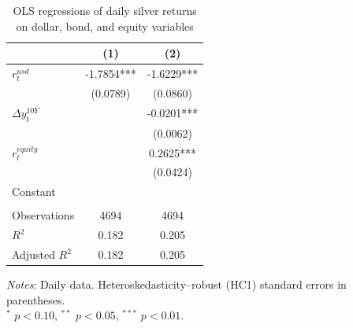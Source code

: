 \begin{table}[H]
\centering
\caption{OLS regressions of daily silver returns on dollar, bond, and equity variables}
\label{tab:ols_silver_dollar}
\begin{tabular}{lcc}
\toprule
 & (1) & (2) \\
\midrule
$r^{usd}_t$ & -1.7854*** & -1.6229*** \\
 & (0.0789) & (0.0860) \\
$\Delta y^{10Y}_t$ &  & -0.0201*** \\
 &  & (0.0062) \\
$r^{equity}_t$ &  & 0.2625*** \\
 &  & (0.0424) \\
Constant &  &  \\
 &  &  \\
Observations & 4694 & 4694 \\
$R^2$ & 0.182 & 0.205 \\
Adjusted $R^2$ & 0.182 & 0.205 \\
\bottomrule
\end{tabular}

\vspace{0.2cm}
\begin{minipage}{0.9\textwidth}
\footnotesize
\textit{Notes}: Daily data. Heteroskedasticity--robust (HC1) standard errors in parentheses.\\
$^*$ $p<0.10$, $^{**}$ $p<0.05$, $^{***}$ $p<0.01$.
\end{minipage}
\end{table}
